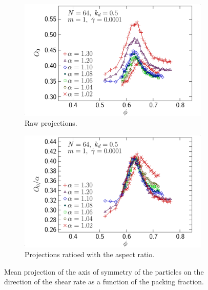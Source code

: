 \documentclass[class=report, float=false, crop=false]{standalone}
\begin{document}
\begin{figure}[h!]
\centering
    \begin{subfigure}[t]{0.49\textwidth}
        \centering
        \includegraphics[width=\textwidth]{figures/figs/ori0_phi_prolate_0064_KDk500_Ml100_GDh100}
        \caption{Raw projections.}
        \label{ori0_phi_prolate_0064_KDk500_Ml100_GDh100}
    \end{subfigure}
    \hfill
    \begin{subfigure}[t]{0.49\textwidth}
        \centering
        \includegraphics[width=\textwidth]{figures/figs/ori0al_phi_prolate_0064_KDk500_Ml100_GDh100}
        \caption{Projections ratioed with the aspect ratio.}
        \label{ori0al_phi_prolate_0064_KDk500_Ml100_GDh100}
    \end{subfigure}
    \caption{Mean projection of the axis of symmetry of the particles on the direction of the shear rate as a function of the packing fraction.}
    \label{ori_phi_0064}
\end{figure}
\end{document}
